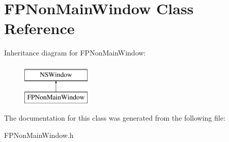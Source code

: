 \hypertarget{interface_f_p_non_main_window}{}\section{F\+P\+Non\+Main\+Window Class Reference}
\label{interface_f_p_non_main_window}
Inheritance diagram for F\+P\+Non\+Main\+Window\+:\begin{figure}[H]
\begin{center}
\leavevmode
\includegraphics[height=2.000000cm]{interface_f_p_non_main_window}
\end{center}
\end{figure}


The documentation for this class was generated from the following file\+:\begin{DoxyCompactItemize}
\item 
F\+P\+Non\+Main\+Window.\+h\end{DoxyCompactItemize}
